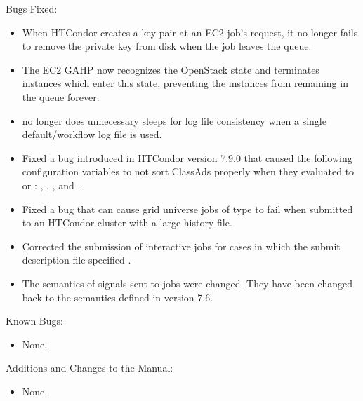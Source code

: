\noindent Bugs Fixed:

\begin{itemize}

\item When HTCondor creates a key pair at an EC2 job's request, it no
longer fails to remove the private key from disk when the job leaves
the queue.

\item The EC2 GAHP now recognizes the OpenStack  state and
terminates instances which enter this state, 
preventing the instances from remaining in the queue forever.

\item {} no longer does unnecessary sleeps for log file
consistency when a single default/workflow log file is used.

\item Fixed a bug introduced in HTCondor version 7.9.0 that caused 
the following configuration variables to not sort ClassAds properly 
when they evaluated to  or :
,
, , and
.

\item Fixed a bug that can cause grid universe jobs of type 
to fail when submitted to an HTCondor cluster with a large history file.

\item Corrected the submission of interactive jobs for cases 
in which the submit description file specified .

\item The semantics of signals sent to jobs were changed.
They have been changed back to the semantics defined in version 7.6.   

\end{itemize}

\noindent Known Bugs:

\begin{itemize}

\item None.

\end{itemize}

\noindent Additions and Changes to the Manual:

\begin{itemize}

\item None.

\end{itemize}

